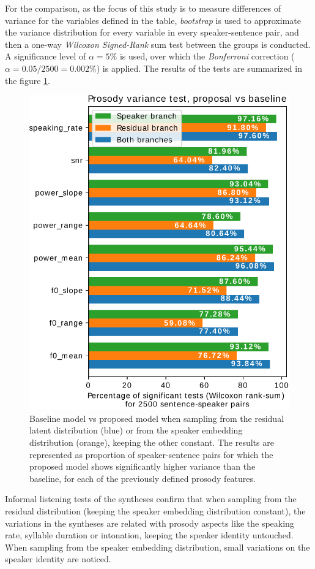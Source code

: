 For the comparison, as the focus of this study is to measure differences of variance for the variables defined in the table, \textit{bootstrap} is used to approximate the variance distribution for every variable in every speaker-sentence pair, and then a one-way \textit{Wilcoxon Signed-Rank} sum test between the groups is conducted. A significance level of $\alpha=5\%$ is used, over which the \textit{Bonferroni} correction ($\alpha=0.05/2500=0.002\%$) is applied. The results of the tests are summarized in the figure \ref{fig:wilcoxon}.

\begin{figure}[h!]
	\centering
	\includegraphics[width=0.7\linewidth]{tts/images/wilcoxon}
	\caption[Comparison of prosody variability between TTS models]{Baseline model vs proposed model when sampling from the residual latent distribution (blue) or from the speaker embedding distribution (orange), keeping the other constant. The results are represented as proportion of speaker-sentence pairs for which the proposed model shows significantly higher variance than the baseline, for each of the previously defined prosody features.}
	\label{fig:wilcoxon}
\end{figure}

Informal listening tests of the syntheses confirm that when sampling from the residual distribution (keeping the speaker embedding distribution constant), the variations in the syntheses are related with prosody aspects like the speaking rate, syllable duration or intonation, keeping the speaker identity untouched. When sampling from the speaker embedding distribution, small variations on the speaker identity are noticed.



